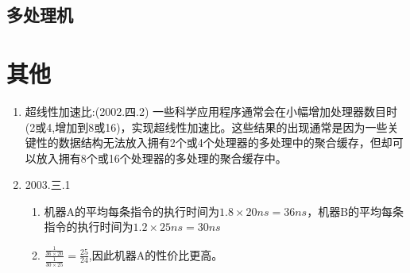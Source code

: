 \documentclass[a4paper]{ctexart}
\begin{document}
\subsection{多处理机}

\section{其他}
\begin{enumerate}
  \item 超线性加速比:(2002.四.2)
  一些科学应用程序通常会在小幅增加处理器数目时(2或4,增加到8或16)，实现超线性加速比。这些结果的出现通常是因为一些关键性的数据结构无法放入拥有2个或4个处理器的多处理中的聚合缓存，但却可以放入拥有8个或16个处理器的多处理的聚合缓存中。
  \item 2003.三.1 
  \begin{enumerate}
    \item 机器A的平均每条指令的执行时间为$1.8\times 20ns=36ns$，机器B的平均每条指令的执行时间为$1.2\times 25ns=30ns$
    \item $\frac{\frac{1}{36\times 20}}{\frac{1}{30\times 25}}=\frac{25}{24}$,因此机器A的性价比更高。
  \end{enumerate}
\end{enumerate}
\end{document}
